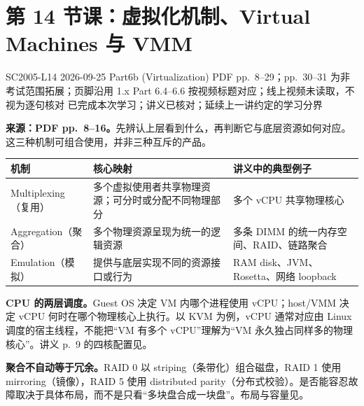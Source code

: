 
\section{第 14 节课：虚拟化机制、Virtual Machines 与 VMM}
\label{lecture:SC2005-L14}

\lecturemeta
  {SC2005-L14}
  {2026-09-25}
  {Part6b (Virtualization)}
  {PDF pp.~8--29；pp.~30--31 为非考试范围拓展；页脚沿用 1.x}
  {Part 6.4--6.6 按视频标题对应；线上视频未读取，不视为逐句核对}
  {已完成本次学习；讲义已核对；延续上一讲约定的学习分界}



\textbf{来源：PDF pp.~8--16。}先辨认上层看到什么，再判断它与底层资源如何对应。这三种机制可组合使用，并非三种互斥的产品。

\begin{center}
\begin{tabularx}{\textwidth}{@{}lXX@{}}
\toprule
机制 & 核心映射 & 讲义中的典型例子 \\
\midrule
Multiplexing（复用） & 多个虚拟使用者共享物理资源；可分时或分配不同物理部分 & 多个 vCPU 共享物理核心 \\
Aggregation（聚合） & 多个物理资源呈现为统一的逻辑资源 & 多条 DIMM 的统一内存空间、RAID、链路聚合 \\
Emulation（模拟） & 提供与底层实现不同的资源接口或行为 & RAM disk、JVM、Rosetta、网络 loopback \\
\bottomrule
\end{tabularx}
\end{center}

\textbf{CPU 的两层调度。}Guest OS 决定 VM 内哪个进程使用 vCPU；host/VMM 决定 vCPU 何时在哪个物理核心上执行。以 KVM 为例，vCPU 通常对应由 Linux 调度的宿主线程，不能把“VM 有多个 vCPU”理解为“VM 永久独占同样多的物理核心”。讲义 p.~9 的四核配置见。

\textbf{聚合不自动等于冗余。}RAID 0 以 striping（条带化）组合磁盘，RAID 1 使用 mirroring（镜像），RAID 5 使用 distributed parity（分布式校验）。是否能容忍故障取决于具体布局，而不是只看“多块盘合成一块盘”。布局与容量见。

